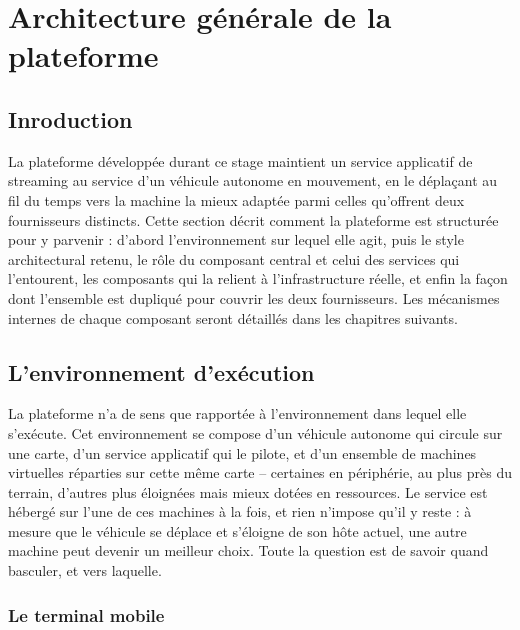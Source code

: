 \newpage
\pagestyle{fancy}

\renewcommand{\headrulewidth}{0.5pt}
\renewcommand{\footrulewidth}{0.5pt}
\chapter{Architecture générale de la plateforme}\setlength{\headheight}{27.06pt}
\label{ch2}
\minitoc


\newpage
\section{Inroduction}
\label{sec:architecture}

La plateforme développée durant ce stage maintient un service applicatif de streaming au service d'un véhicule autonome en mouvement, en le déplaçant au fil du temps vers la machine la mieux adaptée parmi celles qu'offrent deux fournisseurs distincts. Cette section décrit comment la plateforme est structurée pour y parvenir : d'abord l'environnement sur lequel elle agit, puis le style architectural retenu, le rôle du composant central et celui des services qui l'entourent, les composants qui la relient à l'infrastructure réelle, et enfin la façon dont l'ensemble est dupliqué pour couvrir les deux fournisseurs. Les mécanismes internes de chaque composant seront détaillés dans les chapitres suivants.

\section{L'environnement d'exécution}
\label{sec:environnement}

La plateforme n'a de sens que rapportée à l'environnement dans lequel elle s'exécute. Cet environnement se compose d'un véhicule autonome qui circule sur une carte, d'un service applicatif qui le pilote, et d'un ensemble de machines virtuelles réparties sur cette même carte -- certaines en périphérie, au plus près du terrain, d'autres plus éloignées mais mieux dotées en ressources. Le service est hébergé sur l'une de ces machines à la fois, et rien n'impose qu'il y reste : à mesure que le véhicule se déplace et s'éloigne de son hôte actuel, une autre machine peut devenir un meilleur choix. Toute la question est de savoir quand basculer, et vers laquelle.

\subsection{Le terminal mobile}
\label{sec:picarx}

